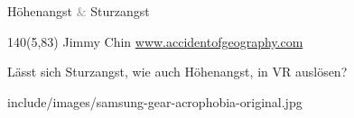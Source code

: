 {
\begin{frame}{Höhenangst \textcolor{gray}{\&} \textcolor{tertiary}{Sturzangst}}
\begin{textblock}{140}(5,83)
	\textcolor{tertiary}{\textcopyright Jimmy Chin}
	\href{http://www.accidentofgeography.com/alex-honnold-epic-el-capitan-triumph/}{www.accidentofgeography.com} 
\end{textblock}
\end{frame}
}

{
	\begin{frame}[standout]
	\end{frame}
}

\begin{frame}{Lässt sich \textcolor{tertiary}{Sturzangst}, wie auch Höhenangst, \textcolor{tertiary}{in VR} auslösen?}
	\centering
	\begin{overpic}[height=0.8\textheight]{include/images/samsung-gear-acrophobia-original.jpg}
	\end{overpic}
\end{frame}

